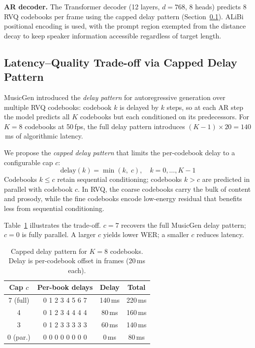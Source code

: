 \documentclass{article}
\begin{document}
\textbf{AR decoder.}
The Transformer decoder (12 layers, $d{=}768$, 8 heads) predicts 8 RVQ codebooks per frame using the capped delay pattern (Section~\ref{ssec:capped_delay}).
ALiBi positional encoding is used, with the prompt region exempted from the distance decay to keep speaker information accessible regardless of target length.

\subsection{Latency--Quality Trade-off via Capped Delay Pattern}
\label{ssec:capped_delay}

MusicGen introduced the \textit{delay pattern} for autoregressive generation over multiple RVQ codebooks: codebook $k$ is delayed by $k$ steps, so at each AR step the model predicts all $K$ codebooks but each conditioned on its predecessors.
For $K{=}8$ codebooks at 50\,fps, the full delay pattern introduces $(K{-}1) \times 20 = 140$\,ms of algorithmic latency.

We propose the \textit{capped delay pattern} that limits the per-codebook delay to a configurable cap $c$:
\begin{equation}
    \text{delay}(k) = \min(k, \; c), \quad k = 0, \ldots, K{-}1
\end{equation}
Codebooks $k \leq c$ retain sequential conditioning; codebooks $k > c$ are predicted in parallel with codebook $c$.
In RVQ, the coarse codebooks carry the bulk of content and prosody, while the fine codebooks encode low-energy residual that benefits less from sequential conditioning.

Table~\ref{tab:capped_delay} illustrates the trade-off.
$c{=}7$ recovers the full MusicGen delay pattern; $c{=}0$ is fully parallel.
A larger $c$ yields lower WER; a smaller $c$ reduces latency.

\begin{table}[h]
\centering
\caption{Capped delay pattern for $K{=}8$ codebooks. Delay is per-codebook offset in frames (20\,ms each).}
\label{tab:capped_delay}
\smallskip

\begin{tabular}{@{}cccc@{}}
\toprule
\textbf{Cap $c$} & \textbf{Per-book delays} & \textbf{Delay} & \textbf{Total} \\
\midrule
7 (full) & 0 1 2 3 4 5 6 7 & 140\,ms & 220\,ms \\
4        & 0 1 2 3 4 4 4 4 & 80\,ms  & 160\,ms \\
3        & 0 1 2 3 3 3 3 3 & 60\,ms  & 140\,ms \\
0 (par.) & 0 0 0 0 0 0 0 0 & 0\,ms   & 80\,ms  \\
\bottomrule
\end{tabular}

\end{table}
\end{document}
